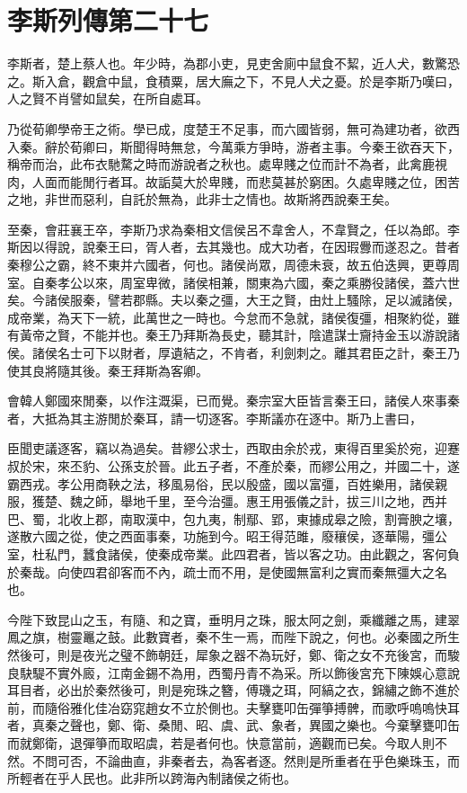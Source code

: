 \chapter{李斯列傳第二十七}

李斯者，楚上蔡人也。年少時，為郡小吏，見吏舍廁中鼠食不絜，近人犬，數驚恐之。斯入倉，觀倉中鼠，食積粟，居大廡之下，不見人犬之憂。於是李斯乃嘆曰，人之賢不肖譬如鼠矣，在所自處耳。

乃從荀卿學帝王之術。學已成，度楚王不足事，而六國皆弱，無可為建功者，欲西入秦。辭於荀卿曰，斯聞得時無怠，今萬乘方爭時，游者主事。今秦王欲吞天下，稱帝而治，此布衣馳騖之時而游說者之秋也。處卑賤之位而計不為者，此禽鹿視肉，人面而能閒行者耳。故詬莫大於卑賤，而悲莫甚於窮困。久處卑賤之位，困苦之地，非世而惡利，自託於無為，此非士之情也。故斯將西說秦王矣。

至秦，會莊襄王卒，李斯乃求為秦相文信侯呂不韋舍人，不韋賢之，任以為郎。李斯因以得說，說秦王曰，胥人者，去其幾也。成大功者，在因瑕釁而遂忍之。昔者秦穆公之霸，終不東并六國者，何也。諸侯尚眾，周德未衰，故五伯迭興，更尊周室。自秦孝公以來，周室卑微，諸侯相兼，關東為六國，秦之乘勝役諸侯，蓋六世矣。今諸侯服秦，譬若郡縣。夫以秦之彊，大王之賢，由灶上騷除，足以滅諸侯，成帝業，為天下一統，此萬世之一時也。今怠而不急就，諸侯復彊，相聚約從，雖有黃帝之賢，不能并也。秦王乃拜斯為長史，聽其計，陰遣謀士齎持金玉以游說諸侯。諸侯名士可下以財者，厚遺結之，不肯者，利劍刺之。離其君臣之計，秦王乃使其良將隨其後。秦王拜斯為客卿。

會韓人鄭國來閒秦，以作注溉渠，已而覺。秦宗室大臣皆言秦王曰，諸侯人來事秦者，大抵為其主游閒於秦耳，請一切逐客。李斯議亦在逐中。斯乃上書曰，

臣聞吏議逐客，竊以為過矣。昔繆公求士，西取由余於戎，東得百里奚於宛，迎蹇叔於宋，來丕豹、公孫支於晉。此五子者，不產於秦，而繆公用之，并國二十，遂霸西戎。孝公用商鞅之法，移風易俗，民以殷盛，國以富彊，百姓樂用，諸侯親服，獲楚、魏之師，舉地千里，至今治彊。惠王用張儀之計，拔三川之地，西并巴、蜀，北收上郡，南取漢中，包九夷，制鄢、郢，東據成皋之險，割膏腴之壤，遂散六國之從，使之西面事秦，功施到今。昭王得范雎，廢穰侯，逐華陽，彊公室，杜私門，蠶食諸侯，使秦成帝業。此四君者，皆以客之功。由此觀之，客何負於秦哉。向使四君卻客而不內，疏士而不用，是使國無富利之實而秦無彊大之名也。

今陛下致昆山之玉，有隨、和之寶，垂明月之珠，服太阿之劍，乘纖離之馬，建翠鳳之旗，樹靈鼉之鼓。此數寶者，秦不生一焉，而陛下說之，何也。必秦國之所生然後可，則是夜光之璧不飾朝廷，犀象之器不為玩好，鄭、衛之女不充後宮，而駿良駃騠不實外廄，江南金錫不為用，西蜀丹青不為采。所以飾後宮充下陳娛心意說耳目者，必出於秦然後可，則是宛珠之簪，傅璣之珥，阿縞之衣，錦繡之飾不進於前，而隨俗雅化佳冶窈窕趙女不立於側也。夫擊甕叩缶彈箏搏髀，而歌呼嗚嗚快耳者，真秦之聲也，鄭、衛、桑閒、昭、虞、武、象者，異國之樂也。今棄擊甕叩缶而就鄭衛，退彈箏而取昭虞，若是者何也。快意當前，適觀而已矣。今取人則不然。不問可否，不論曲直，非秦者去，為客者逐。然則是所重者在乎色樂珠玉，而所輕者在乎人民也。此非所以跨海內制諸侯之術也。

